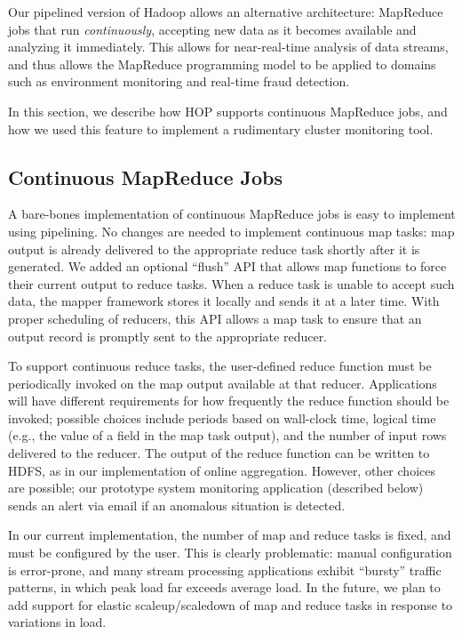 Our pipelined version of Hadoop allows an alternative architecture:
MapReduce jobs that run \emph{continuously}, accepting new data as it
becomes available and analyzing it immediately. This allows for near-real-time
analysis of data streams, and thus
allows the MapReduce programming model to be applied to domains such
as environment monitoring and real-time fraud detection.

In this section, we describe how HOP supports continuous MapReduce
jobs, and how we used this feature to implement a rudimentary
cluster monitoring tool.

\subsection{Continuous MapReduce Jobs}
A bare-bones implementation of continuous MapReduce jobs is easy to
implement using pipelining. No changes are needed to implement
continuous map tasks: map output is already delivered to the
appropriate reduce task shortly after it is generated. We added an
optional ``flush'' API that allows map functions to force their current
output to reduce tasks. When a reduce task is unable to accept such data, the mapper framework
stores it locally and sends it at a later time. 
With proper scheduling of reducers, this API allows a map task to ensure that an output record is promptly sent to the appropriate
reducer.

To support continuous reduce tasks, the user-defined reduce function
must be periodically invoked on the map output available at that
reducer. Applications will have different requirements for how
frequently the reduce function should be invoked; possible choices
include periods based on wall-clock time, logical time (e.g., the
value of a field in the map task output), and the number of input rows
delivered to the reducer. The output of the reduce function can be
written to HDFS, as in our implementation of online
aggregation. However, other choices are possible; our prototype system
monitoring application (described below) sends an alert via email if
an anomalous situation is detected.

In our current implementation, the number of map and reduce tasks is
fixed, and must be configured by the user. This is clearly
problematic: manual configuration is error-prone, and many stream
processing applications exhibit ``bursty'' traffic patterns, in which
peak load far exceeds average load. In the future, we plan to add
support for elastic scaleup/scaledown of map and reduce tasks in
response to variations in load.

